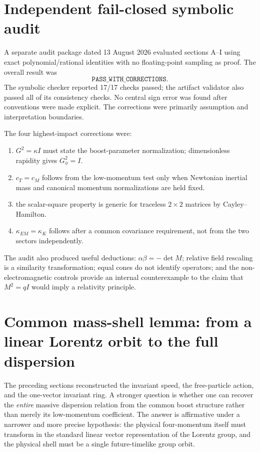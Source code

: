 \documentclass[11pt,a4paper]{article}
\begin{document}
\section{Independent fail-closed symbolic audit}
A separate audit package dated 13 August 2026 evaluated sections A--I using exact polynomial/rational identities with no floating-point sampling as proof. The overall result was
\begin{equation}
\boxed{\texttt{PASS\_WITH\_CORRECTIONS}}.
\end{equation}
The symbolic checker reported 17/17 checks passed; the artifact validator also passed all of its consistency checks. No central sign error was found after conventions were made explicit. The corrections were primarily assumption and interpretation boundaries.

The four highest-impact corrections were:
\begin{enumerate}
\item $G^2=\kappa I$ must state the boost-parameter normalization; dimensionless rapidity gives $G_\phi^2=I$.
\item $c_T=c_M$ follows from the low-momentum test only when Newtonian inertial mass and canonical momentum normalizations are held fixed.
\item the scalar-square property is generic for traceless $2\times2$ matrices by Cayley--Hamilton.
\item $\kappa_{EM}=\kappa_K$ follows after a common covariance requirement, not from the two sectors independently.
\end{enumerate}

The audit also produced useful deductions: $\alpha\beta=-\det M$; relative field rescaling is a similarity transformation; equal cones do not identify operators; and the non-electromagnetic controls provide an internal counterexample to the claim that $M^2=qI$ would imply a relativity principle.


\section{Common mass-shell lemma: from a linear Lorentz orbit to the full dispersion}
The preceding sections reconstructed the invariant speed, the free-particle action, and the one-vector invariant ring.  A stronger question is whether one can recover the \emph{entire} massive dispersion relation from the common boost structure rather than merely its low-momentum coefficient.  The answer is affirmative under a narrower and more precise hypothesis: the physical four-momentum itself must transform in the standard linear vector representation of the Lorentz group, and the physical shell must be a single future-timelike group orbit.
\end{document}
